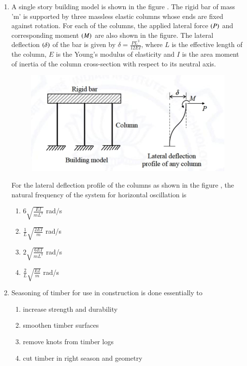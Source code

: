 \documentclass[journal,12pt,onecolumn]{article}
\theoremstyle{remark}
\begin{document}
\begin{enumerate}
\item A single story building model is shown in the figure . The rigid bar of mass 'm' is supported by three massless elastic columns whose ends are fixed against rotation. For each of the columns, the applied lateral force $\left(P\right)$ and corresponding moment $\left(M\right)$ are also shown in the figure. The lateral deflection $\left(\delta\right)$ of the bar is given by $\delta = \frac{PL^3}{12EI}$, where $L$ is the effective length of the column, $E$ is the Young's modulus of elasticity and $I$ is the area moment of inertia of the column cross-section with respect to its neutral axis.
\begin{figure}[H]
    \centering
    \includegraphics[width=0.7\columnwidth]{figs/2q7.jpg}
    \caption{}
    \label{fig:q7}
\end{figure}
For the lateral deflection profile of the columns as shown in the figure , the natural frequency of the system for horizontal oscillation is

\hfill{}

\begin{enumerate}
    \item $6 \sqrt{\frac{EI}{mL^3}}$ rad/s
    \item $\frac{1}{L} \sqrt{\frac{2EI}{m}}$ rad/s
    \item $2 \sqrt{\frac{6EI}{mL^3}}$ rad/s
    \item $\frac{2}{L} \sqrt{\frac{EI}{m}}$ rad/s
\end{enumerate}

\item Seasoning of timber for use in construction is done essentially to

\hfill{}

\begin{enumerate}
    \item increase strength and durability
    \item smoothen timber surfaces
    \item remove knots from timber logs
    \item cut timber in right season and geometry
\end{enumerate}


\end{enumerate}
\end{document}
